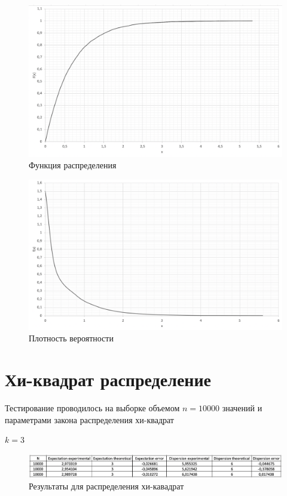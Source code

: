 \documentclass{article}
\begin{document}
		\begin{figure}[!htb]
		    \includegraphics[scale = 0.34]{exp/2.png}
    		\caption{Функция распределения}
		\end{figure}
		 	 	
		\begin{figure}[!htb]
			\includegraphics[scale = 0.32]{exp/3.png}
			\caption{Плотность вероятности}
   		\end{figure}
   	\newpage
	
	\section{Хи-квадрат распределение}
		Тестирование проводилось на выборке объемом $n = 10000$ значений и параметрами закона распределения хи-квадрат
		\begin{center}
			$k = 3$\\
		\end{center}
		\begin{center}
			\begin{figure}[!htb]
				\includegraphics[scale = 0.51]{chisq/1.png}
				\caption{Результаты для распределения хи-кавадрат}
			\end{figure}
		\end{center}
		
\end{document}
